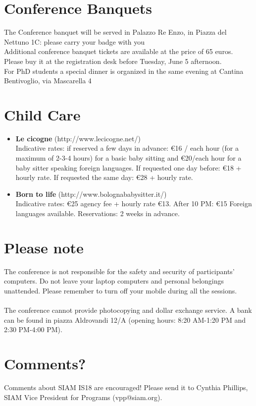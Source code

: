 \section*{Conference Banquets}
The Conference banquet will be served in Palazzo Re Enzo, in Piazza del Nettuno 1C: please carry your badge with you\\ Additional conference banquet tickets are available at the price of 65 euros. Please buy it at the registration desk before Tuesday, June 5 afternoon.\\ For PhD students a special dinner is organized in the same evening at Cantina Bentivoglio, via Mascarella 4

\section*{Child Care}
\begin{itemize}
  \item[] \textbf{Le cicogne} (http://www.lecicogne.net/)\\
Indicative rates: if reserved a few days in advance: \euro 16 / each hour (for a maximum of 2-3-4 hours) for a basic baby sitting and \euro 20/each hour for a baby sitter speaking foreign languages.
If requested one day before: \euro 18 + hourly rate.
If requested the same day: \euro 28 + hourly rate.
  \item[] \textbf{Born to life} (http://www.bolognababysitter.it/)\\
Indicative rates: \euro 25 agency fee + hourly rate \euro 13. After 10 PM: \euro 15 Foreign languages available. Reservations: 2 weeks in advance.
\end{itemize}

\section*{Please note}
The conference is not responsible for the safety and security of participants' computers. Do not leave your laptop computers and personal belongings unattended. Please remember to turn off your mobile during all the sessions.\\\\ The conference cannot provide photocopying and dollar exchange service. A bank can be found in piazza Aldrovandi 12/A (opening hours: 8:20 AM-1:20 PM and 2:30 PM-4:00 PM).

\section*{Comments?}
Comments about SIAM IS18 are encouraged! Please send it to Cynthia Phillips, SIAM Vice President for Programs (vpp@siam.org).
